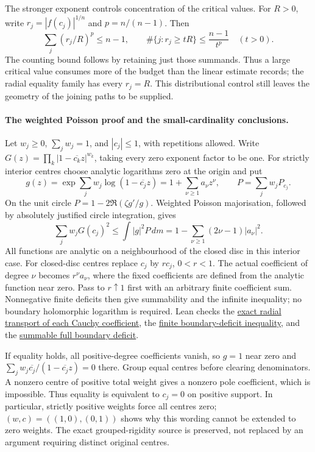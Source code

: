 The stronger exponent controls concentration of the critical values.
For $R>0$, write $r_j=|f(c_j)|^{1/n}$ and $p=n/(n-1)$. Then
\[
 \sum_j(r_j/R)^p\le n-1,\qquad
 \#\{j:r_j\ge tR\}\le\frac{n-1}{t^p}\quad(t>0).
\]
The counting bound follows by retaining just those summands. Thus a large
critical value consumes more of the budget than the linear estimate records;
the radial equality family has every $r_j=R$. This distributional control
still leaves the geometry of the joining paths to be supplied.

\paragraph{The weighted Poisson proof and the small-cardinality conclusions.}
Let $w_j\ge0$, $\sum_jw_j=1$, and $|c_j|\le1$, with repetitions allowed.
Write $G(z)=\prod_k|1-\overline{c_k}z|^{w_k}$, taking every zero exponent
factor to be one. For strictly interior centres choose analytic logarithms
zero at the origin and put
\[
 g(z)=\exp\sum_jw_j\log(1-\overline{c_j}z)
     =1+\sum_{\nu\ge1}a_\nu z^\nu,\qquad
 P=\sum_jw_jP_{c_j}.
\]
On the unit circle $P=1-2\Re(\zeta g'/g)$. Weighted Poisson majorisation,
followed by absolutely justified circle integration, gives
\[
 \sum_jw_jG(c_j)^2\le\int |g|^2P\,dm
 =1-\sum_{\nu\ge1}(2\nu-1)|a_\nu|^2.
\]
All functions are analytic on a neighbourhood of the closed disc in this
interior case. For closed-disc centres replace $c_j$ by $rc_j$, $0<r<1$.
The actual coefficient of degree $\nu$ becomes $r^\nu a_\nu$, where the
fixed coefficients are defined from the analytic function near zero.
Pass to $r\uparrow1$ first with an arbitrary finite coefficient sum.
Nonnegative finite deficits then give summability and the infinite inequality;
no boundary holomorphic logarithm is required. Lean checks the
\href{https://github.com/wcook04/plectis-erdos/blob/3f1a5e9b284b9c3348eebd549e24c2f3972606ae/ErdosProblems/Erdos1041/WeightedCauchyTransportR10.lean\#L66}{exact radial transport of each Cauchy coefficient},
the
\href{https://github.com/wcook04/plectis-erdos/blob/3f1a5e9b284b9c3348eebd549e24c2f3972606ae/ErdosProblems/Erdos1041/WeightedBoundaryDeficitR10.lean\#L108}{finite boundary-deficit inequality},
and the
\href{https://github.com/wcook04/plectis-erdos/blob/3f1a5e9b284b9c3348eebd549e24c2f3972606ae/ErdosProblems/Erdos1041/WeightedBoundaryDeficitR10.lean\#L153}{summable full boundary deficit}.

If equality holds, all positive-degree coefficients vanish, so $g=1$ near
zero and $\sum_jw_j\overline{c_j}/(1-\overline{c_j}z)=0$ there.
Group equal centres before clearing denominators. A nonzero centre of positive
total weight gives a nonzero pole coefficient, which is impossible. Thus
equality is equivalent to $c_j=0$ on positive support. In particular,
strictly positive weights force all centres zero; $(w,c)=((1,0),(0,1))$
shows why this wording cannot be extended to zero weights.
The exact grouped-rigidity source is preserved, not replaced by an argument
requiring distinct original centres.

